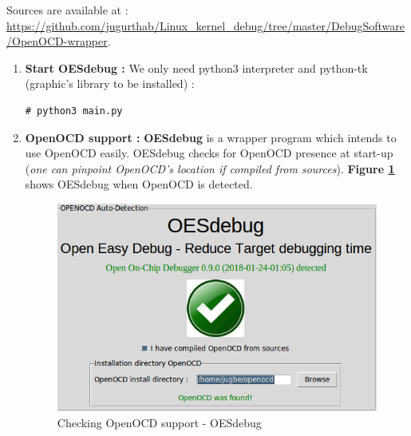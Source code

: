 \begin{enumerate}
\begin{center}
\begin{mdframed}[
        linecolor=red,linewidth=2pt,%
        frametitlerule=true,%
        apptotikzsetting={\tikzset{mdfframetitlebackground/.append style={%
            shade,left color=white, right color=blue!20}}}, 
        frametitlerulecolor=blue,
        frametitlerulewidth=1pt, innertopmargin=\topskip,
        frametitle={OESdebug sources},
        outerlinewidth=1.25pt
    ]
		Sources are available at : {\color{blue}\url{https://github.com/jugurthab/Linux_kernel_debug/tree/master/DebugSoftware/OpenOCD-wrapper}}.
\end{mdframed}
\end{center}

	
	
	\begin{enumerate}
		\item \textbf{Start OESdebug : } We only need python3 interpreter and python-tk (graphic's library to be installed) :
		\begin{lstlisting}[style=BashInputStyle]
# python3 main.py
	\end{lstlisting}	
			
	
		\item \textbf{OpenOCD support :} \textbf{OESdebug} is a wrapper program which intends to use OpenOCD easily. OESdebug checks for OpenOCD presence at start-up (\textit{one can pinpoint OpenOCD's location if compiled from sources}). \textbf{Figure \ref{Checking OpenOCD support - OESdebug}} shows OESdebug when OpenOCD is detected.		
		\begin{figure}[H]
			\centering
        	\includegraphics[scale=0.45]{img/solution/OESdebug-detect-OpenOCD.png}
        	\caption{Checking OpenOCD support - OESdebug}
        	\label{Checking OpenOCD support - OESdebug}
    	\end{figure}
		

\end{enumerate}
\end{enumerate}
